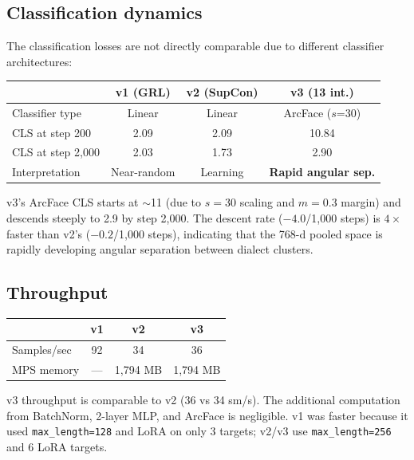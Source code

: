 \documentclass[11pt,a4paper]{article}
\begin{document}
\subsection{Classification dynamics}

The classification losses are not directly comparable due to different
classifier architectures:

\begin{center}
\begin{tabular}{lccc}
\toprule
& \textbf{v1 (GRL)} & \textbf{v2 (SupCon)} & \textbf{v3 (13 int.)} \\
\midrule
Classifier type & Linear & Linear & ArcFace ($s$=30) \\
CLS at step 200 & 2.09 & 2.09 & 10.84 \\
CLS at step 2{,}000 & 2.03 & 1.73 & 2.90 \\
\midrule
Interpretation & Near-random & Learning & \textbf{Rapid angular sep.} \\
\bottomrule
\end{tabular}
\end{center}

v3's ArcFace CLS starts at $\sim$11 (due to $s = 30$ scaling and $m = 0.3$
margin) and descends steeply to 2.9 by step 2{,}000. The descent rate
($-4.0$/1{,}000 steps) is $4\times$ faster than v2's ($-0.2$/1{,}000 steps),
indicating that the 768-d pooled space is rapidly developing angular
separation between dialect clusters.

\subsection{Throughput}

\begin{center}
\begin{tabular}{lccc}
\toprule
& \textbf{v1} & \textbf{v2} & \textbf{v3} \\
\midrule
Samples/sec & 92 & 34 & 36 \\
MPS memory & --- & 1{,}794 MB & 1{,}794 MB \\
\bottomrule
\end{tabular}
\end{center}

v3 throughput is comparable to v2 (36 vs 34 sm/s). The additional
computation from BatchNorm, 2-layer MLP, and ArcFace is negligible.
v1 was faster because it used \texttt{max\_length=128} and LoRA on
only 3 targets; v2/v3 use \texttt{max\_length=256} and 6 LoRA targets.
\end{document}
